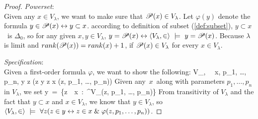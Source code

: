 \begin{proof}
\item \emph{Powerset}: \\
Given any $x \in V_\lambda$, we want to make sure that $\mathscr{P} (x) \in V_\lambda$. Let $\varphi(y)$ denote the formula $y \in \mathscr{P} (x) \leftrightarrow y \subset x$.
according to definition of subset (\ref{def:subset}), $y \subset x$ is $\Delta_0$, so for any given $x, y \in V_\lambda$, $y = \mathscr{P} (x) \leftrightarrow \langle V_\lambda, \in \rangle~\models~y = \mathscr{P} (x)$.
Because $\lambda$ is limit and $rank(\mathscr{P} (x)) = rank(x)+1$, if $\mathscr{P} (x) \in V_\lambda$ for every $x \in V_\lambda$.

\item \emph{Specification}: \\ %
Given a first-order formula $\varphi$, we want to show the following:
\beq
\langle V_\lambda, \in \rangle~\models~\forall x, p_1, \ldots, p_n, \exists y \forall z (z \in y \iff z \in x \et \varphi(z, p_1, \ldots, p_n))
\eeq
Given any~$x$~along with parameters $p_1, \ldots, p_n$ in $V_\lambda$, we set
\beq
y~=~\{z~\in~x~:~\varphi^{V_\lambda}(z, p_1, \ldots, p_n)\}
\eeq
From transitivity of $V_\lambda$ and the fact that $y \subset x$ and $x \in V_\lambda$, we know that $y \in V_\lambda$, 
so $\langle V_\lambda, \in \rangle~\models~\forall z (z \in y \leftrightarrow z \in x \mathrel{\&} \varphi(z, p_1, \dots, p_n))$.
\ece
\end{proof}




